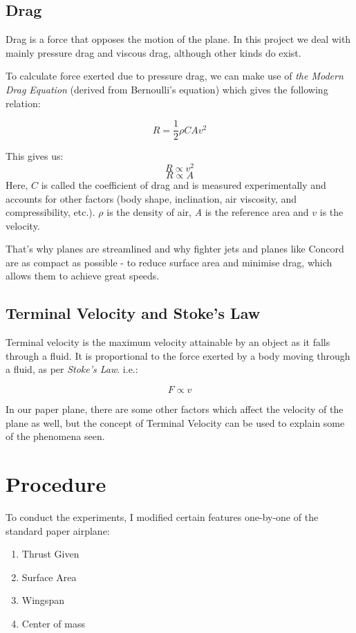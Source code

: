 \documentclass[12pt]{article}
\begin{document}
\subsection{Drag}
Drag is a force that opposes the motion of the plane. In this project we deal with mainly pressure drag and viscous drag, although other kinds do exist.

To calculate force exerted due to pressure drag, we can make use of \emph{the Modern Drag Equation} (derived from Bernoulli's equation) which gives the following relation:

\begin{equation}\label{eq:drag equation}
	R = \frac{1}{2} \rho C A v^{2} 
\end{equation}

This gives us:
\begin{equation}
	R \propto v^{2}
\end{equation}
\begin{equation} 
	R \propto A
\end{equation}
Here, $C$ is called the coefficient of drag and is measured experimentally and accounts for other factors (body shape, inclination, air viscosity, and compressibility, etc.). $\rho$ is the density of air, \emph{A} is the reference area and $v$ is the velocity.

That's why planes are streamlined and why fighter jets and planes like Concord are as compact as possible - to reduce surface area and minimise drag, which allows them to achieve great speeds.
\subsection{Terminal Velocity and Stoke's Law}
Terminal velocity is the maximum velocity attainable by an object as it falls through a fluid. It is proportional to the force exerted by a body moving through a fluid, as per \emph{Stoke's Law}. i.e.:

\begin{equation}\label{eq:Stoke's Law}
	F \propto v
\end{equation}

In our paper plane, there are some other factors which affect the velocity of the plane as well, but
the concept of Terminal Velocity can be used to explain some of the phenomena seen.

\section{Procedure}
To conduct the experiments, I modified certain features one-by-one of the standard paper airplane:
\begin{enumerate}
	\item Thrust Given
	\item Surface Area
	\item Wingspan
	\item Center of mass
\end{enumerate}
\end{document}
